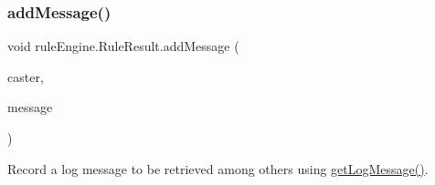 \subsubsection{\texorpdfstring{add\+Message()}{addMessage()}\hspace{0.1cm}{\footnotesize\ttfamily [1/3]}}
{\footnotesize\ttfamily void rule\+Engine.\+Rule\+Result.\+add\+Message (\begin{DoxyParamCaption}\item[{\mbox{\hyperlink{interfacerule_engine_1_1rules_1_1new_rules_1_1_i_rule}{I\+Rule}}}]{caster,  }\item[{String}]{message }\end{DoxyParamCaption})\hspace{0.3cm}{\ttfamily [inline]}}

Record a log message to be retrieved among others using \mbox{\hyperlink{classrule_engine_1_1_rule_result_a25680c11a9156d9052b04a1803f81e9f}{get\+Log\+Message()}}.


